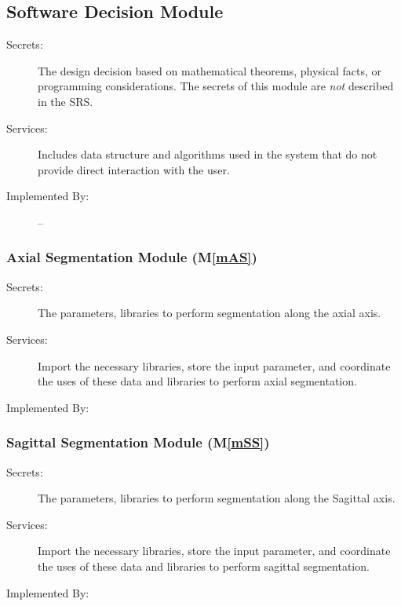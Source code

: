 \documentclass[12pt, titlepage]{article}
\newcounter{mnum}
\newcommand{\mthemnum}{M\themnum}
\newcommand{\mref}[1]{M\ref{#1}}
\begin{document}
\subsection{Software Decision Module}

\begin{description}
\item[Secrets:] The design decision based on mathematical theorems, physical
  facts, or programming considerations. The secrets of this module are
  \emph{not} described in the SRS.
\item[Services:] Includes data structure and algorithms used in the system that
  do not provide direct interaction with the user. 
\item[Implemented By:] --
\end{description}


\subsubsection{Axial Segmentation Module (\mref{mAS})}
\begin{description}
\item[Secrets:] The parameters, libraries to perform segmentation along the axial axis.
\item[Services:] Import the necessary libraries, store the input parameter, and coordinate the uses of these data and libraries to perform axial segmentation.
\item[Implemented By:] \progname
\end{description}

\subsubsection{Sagittal Segmentation Module (\mref{mSS})}
\begin{description}
\item[Secrets:] The parameters, libraries to perform segmentation along the Sagittal axis.
\item[Services:] Import the necessary libraries, store the input parameter, and coordinate the uses of these data and libraries to perform sagittal segmentation.
\item[Implemented By:] \progname
\end{description}
\end{document}
